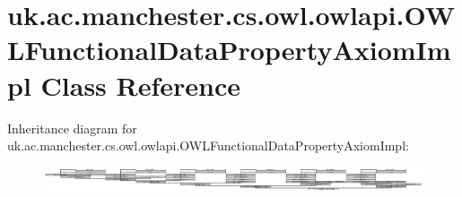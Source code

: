 \hypertarget{classuk_1_1ac_1_1manchester_1_1cs_1_1owl_1_1owlapi_1_1_o_w_l_functional_data_property_axiom_impl}{\section{uk.\-ac.\-manchester.\-cs.\-owl.\-owlapi.\-O\-W\-L\-Functional\-Data\-Property\-Axiom\-Impl Class Reference}
\label{classuk_1_1ac_1_1manchester_1_1cs_1_1owl_1_1owlapi_1_1_o_w_l_functional_data_property_axiom_impl}
}
Inheritance diagram for uk.\-ac.\-manchester.\-cs.\-owl.\-owlapi.\-O\-W\-L\-Functional\-Data\-Property\-Axiom\-Impl\-:\begin{figure}[H]
\begin{center}
\leavevmode
\includegraphics[height=0.720618cm]{classuk_1_1ac_1_1manchester_1_1cs_1_1owl_1_1owlapi_1_1_o_w_l_functional_data_property_axiom_impl}
\end{center}
\end{figure}

